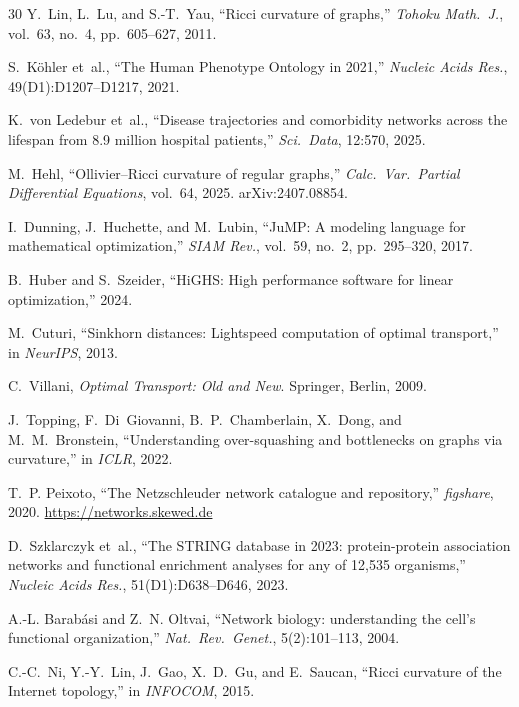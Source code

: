 \documentclass[11pt,a4paper]{article}
\begin{document}
\begin{thebibliography}{30}
Y.~Lin, L.~Lu, and S.-T.~Yau,
``Ricci curvature of graphs,''
\emph{Tohoku Math.~J.}, vol.~63, no.~4, pp.~605--627, 2011.

S.~K{\"o}hler et~al.,
``The Human Phenotype Ontology in 2021,''
\emph{Nucleic Acids Res.}, 49(D1):D1207--D1217, 2021.

K.~von Ledebur et~al.,
``Disease trajectories and comorbidity networks across the lifespan from 8.9 million hospital patients,''
\emph{Sci.~Data}, 12:570, 2025.

M.~Hehl,
``Ollivier--Ricci curvature of regular graphs,''
\emph{Calc.~Var.~Partial Differential Equations}, vol.~64, 2025. arXiv:2407.08854.

I.~Dunning, J.~Huchette, and M.~Lubin,
``JuMP: A modeling language for mathematical optimization,''
\emph{SIAM Rev.}, vol.~59, no.~2, pp.~295--320, 2017.

B.~Huber and S.~Szeider,
``HiGHS: High performance software for linear optimization,'' 2024.

M.~Cuturi,
``Sinkhorn distances: Lightspeed computation of optimal transport,''
in \emph{NeurIPS}, 2013.

C.~Villani,
\emph{Optimal Transport: Old and New}.
Springer, Berlin, 2009.

J.~Topping, F.~Di~Giovanni, B.~P.~Chamberlain, X.~Dong, and M.~M.~Bronstein,
``Understanding over-squashing and bottlenecks on graphs via curvature,''
in \emph{ICLR}, 2022.

T.~P. Peixoto,
``The Netzschleuder network catalogue and repository,''
\emph{figshare}, 2020. \url{https://networks.skewed.de}

D.~Szklarczyk et~al.,
``The STRING database in 2023: protein-protein association networks and functional enrichment analyses for any of 12{,}535 organisms,''
\emph{Nucleic Acids Res.}, 51(D1):D638--D646, 2023.

A.-L. Barab\'asi and Z.~N. Oltvai,
``Network biology: understanding the cell's functional organization,''
\emph{Nat.~Rev.~Genet.}, 5(2):101--113, 2004.

C.-C.~Ni, Y.-Y.~Lin, J.~Gao, X.~D.~Gu, and E.~Saucan,
``Ricci curvature of the Internet topology,''
in \emph{INFOCOM}, 2015.


\end{thebibliography}
\end{document}
